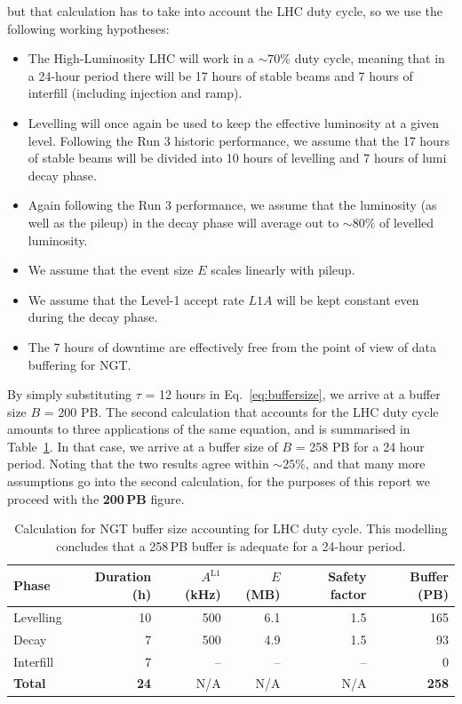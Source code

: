 \begin{itemize}
but that calculation has to take into account the LHC duty cycle, so we use the following working hypotheses:
\begin{itemize}
\item The High-Luminosity LHC will work in a $\sim70\%$ duty cycle, meaning that in a 24-hour period there will be 17 hours of stable beams and 7 hours of interfill (including injection and ramp).
\item Levelling will once again be used to keep the effective luminosity at a given level.
Following the Run 3 historic performance, we assume that the 17 hours of stable beams will be divided into 10 hours of levelling and 7 hours of lumi decay phase.
\item Again following the Run 3 performance, we assume that the luminosity (as well as the pileup) in the decay phase will average out to $\sim80\%$ of levelled luminosity.
\item We assume that the event size $E$ scales linearly with pileup.
\item We assume that the Level-1 accept rate $L1A$ will be kept constant even during the decay phase. 
\item The 7 hours of downtime are effectively free from the point of view of data buffering for NGT.
\end{itemize}
\end{itemize}

By simply substituting $\tau$ = 12 hours in Eq.~\ref{eq:buffersize}, we arrive at a buffer size $B$ = 200 PB.
The second calculation that accounts for the LHC duty cycle amounts to three applications of the same equation,
and is summarised in Table~\ref{tab:bufferWithDutyCycle}. In that case, we arrive at a buffer size of $B$ = 258 PB for a 24 hour period.
Noting that the two results agree within $\sim25\%$, and that many more assumptions go into the second calculation, for the purposes of this report we proceed with the \textbf{200\,PB} figure.
\begin{table}[htbp]
   \centering
   \begin{tabular}{@{} lrrrrr @{}} %
      \toprule
		Phase & Duration (h) & $A^{\text{L1}}$ (kHz) & $E$ (MB) & Safety factor & Buffer (PB)\\
      	\midrule
		Levelling & 10 & 500 & 6.1 & 1.5 & 165 \\
		Decay     &  7 & 500 & 4.9 & 1.5 &  93 \\
		Interfill &  7 &  -- &  -- &  -- &   0 \\
		\midrule
\textbf{Total}    & \textbf{24} & N/A & N/A & N/A & \textbf{258}\\ 
      \bottomrule
   \end{tabular}
   \caption{Calculation for NGT buffer size accounting for LHC duty cycle. 
   This modelling concludes that a 258\,PB buffer is adequate for a 24-hour period.}
   \label{tab:bufferWithDutyCycle}
\end{table}

